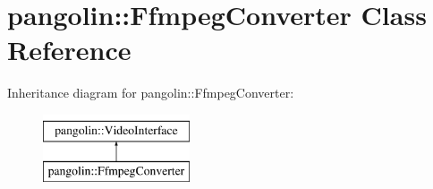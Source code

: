\hypertarget{classpangolin_1_1_ffmpeg_converter}{}\section{pangolin\+:\+:Ffmpeg\+Converter Class Reference}
\label{classpangolin_1_1_ffmpeg_converter}
Inheritance diagram for pangolin\+:\+:Ffmpeg\+Converter\+:\begin{figure}[H]
\begin{center}
\leavevmode
\includegraphics[height=2.000000cm]{classpangolin_1_1_ffmpeg_converter}
\end{center}
\end{figure}
